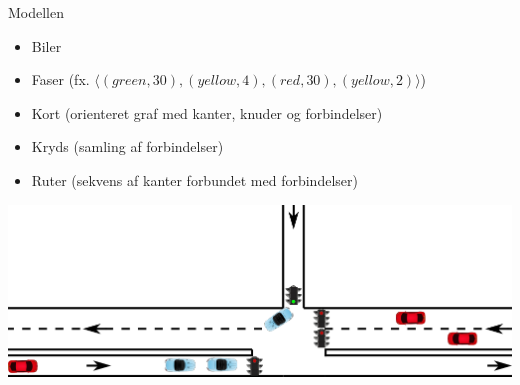 \begin{frame}{Modellen}
\begin{itemize}
\item Biler
\item Faser (fx. $\langle(green, 30), (yellow, 4), (red, 30), (yellow, 2)\rangle$)
\item Kort (orienteret graf med kanter, knuder og forbindelser)
\item Kryds (samling af forbindelser)
\item Ruter (sekvens af kanter forbundet med forbindelser)
\end{itemize}

\includegraphics[width=1\textwidth]{../images/introNetworkSimple.png}
\end{frame}
